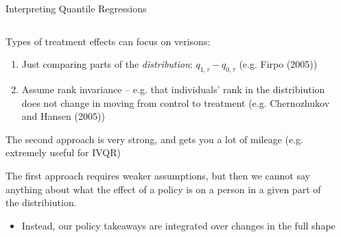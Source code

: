 \documentclass[notes,11pt, aspectratio=169]{beamer}
\newenvironment{wideitemize}{\itemize\addtolength{\itemsep}{10pt}}{\enditemize}
\begin{document}
\begin{frame}{Interpreting Quantile Regressions}
  \begin{columns}[T] %
    \begin{column}{.7\textwidth}
      \begin{wideitemize}
      \item Types of treatment effects can focus on verisons:
        \begin{enumerate}
        \item Just comparing parts of the \emph{distribution}: $q_{1,\tau} - q_{0,\tau}$ (e.g. Firpo (2005))
        \item Assume rank invariance -- e.g. that individuals' rank
          in the distribiution does not change in moving from
          control to treatment (e.g. Chernozhukov and Hansen (2005))
        \end{enumerate}
      \item The second approach is very strong, and gets you a lot
        of mileage (e.g. extremely useful for IVQR)
      \item The first approach requires weaker assumptions, but then
        we cannot say anything about what the effect of a policy is on
        a person in a given part of the distribiution.
        \begin{itemize}
        \item Instead, our policy takeaways are integrated over changes in the full shape
        \end{itemize}
      \end{wideitemize}
    \end{column}%
    \hfill%
    \begin{column}{.4\textwidth}
    \end{column}
  \end{columns}
\end{frame}
\end{document}
